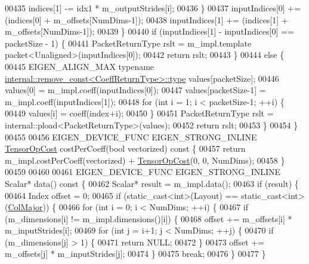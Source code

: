 \begin{DoxyCode}
00435         indices[1] -= idx1 * m\_outputStrides[i];
00436       \}
00437       inputIndices[0] += (indices[0] + m\_offsets[NumDims-1]);
00438       inputIndices[1] += (indices[1] + m\_offsets[NumDims-1]);
00439     \}
00440     \textcolor{keywordflow}{if} (inputIndices[1] - inputIndices[0] == packetSize - 1) \{
00441       PacketReturnType rslt = m\_impl.template packet<Unaligned>(inputIndices[0]);
00442       \textcolor{keywordflow}{return} rslt;
00443     \}
00444     \textcolor{keywordflow}{else} \{
00445       EIGEN\_ALIGN\_MAX \textcolor{keyword}{typename} \hyperlink{group___sparse_core___module}{internal::remove\_const<CoeffReturnType>::type}
       values[packetSize];
00446       values[0] = m\_impl.coeff(inputIndices[0]);
00447       values[packetSize-1] = m\_impl.coeff(inputIndices[1]);
00448       \textcolor{keywordflow}{for} (\textcolor{keywordtype}{int} i = 1; i < packetSize-1; ++i) \{
00449         values[i] = coeff(index+i);
00450       \}
00451       PacketReturnType rslt = internal::pload<PacketReturnType>(values);
00452       \textcolor{keywordflow}{return} rslt;
00453     \}
00454   \}
00455 
00456   EIGEN\_DEVICE\_FUNC EIGEN\_STRONG\_INLINE \hyperlink{class_eigen_1_1_tensor_op_cost}{TensorOpCost} costPerCoeff(\textcolor{keywordtype}{bool} vectorized)\textcolor{keyword}{ const }\{
00457     \textcolor{keywordflow}{return} m\_impl.costPerCoeff(vectorized) + \hyperlink{class_eigen_1_1_tensor_op_cost}{TensorOpCost}(0, 0, NumDims);
00458   \}
00459 
00460 
00461   EIGEN\_DEVICE\_FUNC EIGEN\_STRONG\_INLINE Scalar* data()\textcolor{keyword}{ const }\{
00462     Scalar* result = m\_impl.data();
00463     \textcolor{keywordflow}{if} (result) \{
00464       Index offset = 0;
00465       \textcolor{keywordflow}{if} (static\_cast<int>(Layout) == static\_cast<int>(\hyperlink{group__enums_ggaacded1a18ae58b0f554751f6cdf9eb13a0cbd4bdd0abcfc0224c5fcb5e4f6669a}{ColMajor})) \{
00466         \textcolor{keywordflow}{for} (\textcolor{keywordtype}{int} i = 0; i < NumDims; ++i) \{
00467           \textcolor{keywordflow}{if} (m\_dimensions[i] != m\_impl.dimensions()[i]) \{
00468             offset += m\_offsets[i] * m\_inputStrides[i];
00469             \textcolor{keywordflow}{for} (\textcolor{keywordtype}{int} j = i+1; j < NumDims; ++j) \{
00470               \textcolor{keywordflow}{if} (m\_dimensions[j] > 1) \{
00471                 \textcolor{keywordflow}{return} NULL;
00472               \}
00473               offset += m\_offsets[j] * m\_inputStrides[j];
00474             \}
00475             \textcolor{keywordflow}{break};
00476           \}
00477         \}

\end{DoxyCode}
